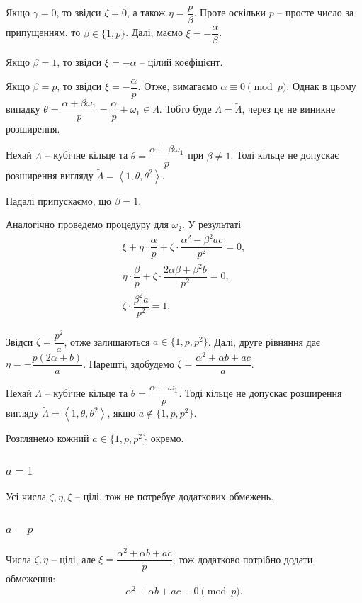 \documentclass{thesis}
\begin{document}
Якщо $\gamma = 0$, то звідси $\zeta = 0$, а також $\eta = \dfrac{p}{\beta}$. Проте оскільки $p$ -- просте число за припущенням, то $\beta \in \{1,p\}$. Далі, маємо $\xi = - \dfrac{\alpha}{\beta}$.

Якщо $\beta = 1$, то звідси $\xi = -\alpha$ -- цілий коефіцієнт.

Якщо $\beta = p$, то звідси $\xi = -\dfrac{\alpha}{p}$. Отже, вимагаємо $\alpha \equiv 0 \pmod p$. Однак в цьому випадку $\theta = \dfrac{\alpha + \beta \omega_1}{p} = \dfrac{\alpha}{p} + \omega_1 \in \Lambda$. Тобто буде $\Lambda = \tilde{\Lambda}$, через це не виникне розширення.

\begin{lemma}
Нехай $\Lambda$ -- кубічне кільце та $\theta = \dfrac{\alpha + \beta \omega_1}{p}$ при $\beta \neq 1$. Тоді кільце не допускає розширення вигляду $\tilde{\Lambda} = \left< 1,\theta,\theta^2\right>$.
\end{lemma}

Надалі припускаємо, що $\beta = 1$.

Аналогічно проведемо процедуру для $\omega_2$. У результаті
\begin{align*}
\xi + \eta \cdot \dfrac{\alpha}{p} + \zeta \cdot \dfrac{\alpha^2 - \beta^2 ac}{p^2} = 0, \\
\eta \cdot \dfrac{\beta}{p} + \zeta \cdot \dfrac{2\alpha\beta + \beta^2 b}{p^2} = 0, \\
\zeta \cdot \dfrac{\beta^2 a}{p^2} = 1.
\end{align*}

Звідси $\zeta = \dfrac{p^2}{a}$, отже залишаються $a \in \{1,p,p^2\}$. Далі, друге рівняння дає $\eta = -\dfrac{p(2\alpha+b)}{a}$. Нарешті, здобудемо $\xi = \dfrac{\alpha^2 + \alpha b + ac}{a}$.

\begin{lemma}
Нехай $\Lambda$ -- кубічне кільце та $\theta = \dfrac{\alpha + \omega_1}{p}$. Тоді кільце не допускає розширення вигляду $\tilde{\Lambda} = \left< 1,\theta,\theta^2\right>$, якщо $a \notin \{1,p,p^2\}$.
\end{lemma}

Розглянемо кожний $a \in \{1,p,p^2\}$ окремо.
\subsubsection{$a = 1$} Усі числа $\zeta,\eta,\xi$ -- цілі, тож не потребує додаткових обмежень.

\subsubsection{$a = p$} Числа $\zeta,\eta$ -- цілі, але $\xi = \dfrac{\alpha^2 + \alpha b + ac}{p}$, тож додатково потрібно додати обмеження:
\begin{equation*}
\alpha^2 + \alpha b + ac \equiv 0 \pmod p.
\end{equation*}
\end{document}
